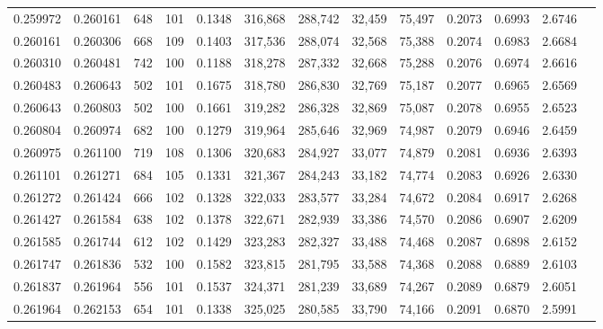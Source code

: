 \begin{tabular}{rrrrrrrrrrrrr}
0.259972 & 0.260161 &   648 & 101 &                                     0.1348 & 316,868 & 288,742 &  32,459 &  75,497 & 0.2073 & 0.6993 & 2.6746 \\
0.260161 & 0.260306 &   668 & 109 &                                     0.1403 & 317,536 & 288,074 &  32,568 &  75,388 & 0.2074 & 0.6983 & 2.6684 \\
0.260310 & 0.260481 &   742 & 100 &                                     0.1188 & 318,278 & 287,332 &  32,668 &  75,288 & 0.2076 & 0.6974 & 2.6616 \\
0.260483 & 0.260643 &   502 & 101 &                                     0.1675 & 318,780 & 286,830 &  32,769 &  75,187 & 0.2077 & 0.6965 & 2.6569 \\
0.260643 & 0.260803 &   502 & 100 &                                     0.1661 & 319,282 & 286,328 &  32,869 &  75,087 & 0.2078 & 0.6955 & 2.6523 \\
0.260804 & 0.260974 &   682 & 100 &                                     0.1279 & 319,964 & 285,646 &  32,969 &  74,987 & 0.2079 & 0.6946 & 2.6459 \\
0.260975 & 0.261100 &   719 & 108 &                                     0.1306 & 320,683 & 284,927 &  33,077 &  74,879 & 0.2081 & 0.6936 & 2.6393 \\
0.261101 & 0.261271 &   684 & 105 &                                     0.1331 & 321,367 & 284,243 &  33,182 &  74,774 & 0.2083 & 0.6926 & 2.6330 \\
0.261272 & 0.261424 &   666 & 102 &                                     0.1328 & 322,033 & 283,577 &  33,284 &  74,672 & 0.2084 & 0.6917 & 2.6268 \\
0.261427 & 0.261584 &   638 & 102 &                                     0.1378 & 322,671 & 282,939 &  33,386 &  74,570 & 0.2086 & 0.6907 & 2.6209 \\
0.261585 & 0.261744 &   612 & 102 &                                     0.1429 & 323,283 & 282,327 &  33,488 &  74,468 & 0.2087 & 0.6898 & 2.6152 \\
0.261747 & 0.261836 &   532 & 100 &                                     0.1582 & 323,815 & 281,795 &  33,588 &  74,368 & 0.2088 & 0.6889 & 2.6103 \\
0.261837 & 0.261964 &   556 & 101 &                                     0.1537 & 324,371 & 281,239 &  33,689 &  74,267 & 0.2089 & 0.6879 & 2.6051 \\
0.261964 & 0.262153 &   654 & 101 &                                     0.1338 & 325,025 & 280,585 &  33,790 &  74,166 & 0.2091 & 0.6870 & 2.5991 \\

\end{tabular}
